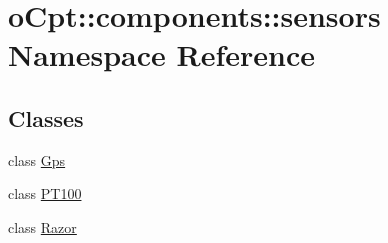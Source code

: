 \hypertarget{namespaceo_cpt_1_1components_1_1sensors}{}\section{o\+Cpt\+:\+:components\+:\+:sensors Namespace Reference}
\label{namespaceo_cpt_1_1components_1_1sensors}
\subsection*{Classes}
\begin{DoxyCompactItemize}
\item 
class \hyperlink{classo_cpt_1_1components_1_1sensors_1_1_gps}{Gps}
\item 
class \hyperlink{classo_cpt_1_1components_1_1sensors_1_1_p_t100}{P\+T100}
\item 
class \hyperlink{classo_cpt_1_1components_1_1sensors_1_1_razor}{Razor}
\end{DoxyCompactItemize}
